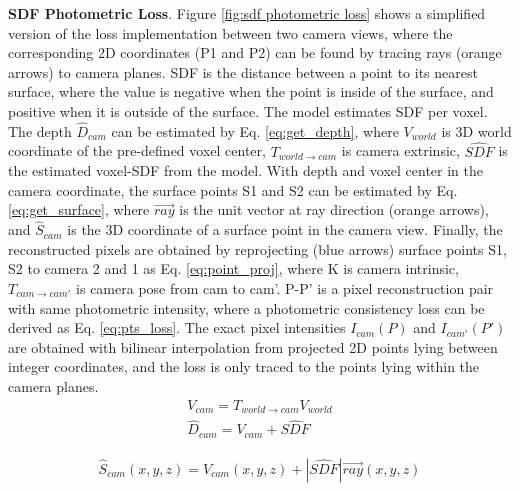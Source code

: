 \noindent
\textbf{SDF Photometric Loss}. Figure \ref{fig:sdf photometric loss} shows a simplified version of the loss implementation between two camera views, where the corresponding 2D coordinates (P1 and P2) can be found by tracing rays (orange arrows) to camera planes. SDF is the distance between a point to its nearest surface, where the value is negative when the point is inside of the surface, and positive when it is outside of the surface. The model estimates SDF per voxel. The depth $\hat{D}_{cam}$ can be estimated by Eq. \ref{eq:get_depth}, where $V_{world}$ is 3D world coordinate of the pre-defined voxel center, $T_{world\xrightarrow{}cam}$ is camera extrinsic, $\hat{SDF}$ is the estimated voxel-SDF from the model. With depth and voxel center in the camera coordinate, the surface points S1 and S2 can be estimated by Eq. \ref{eq:get_surface}, where $\vec{ray}$ is the unit vector at ray direction (orange arrows), and $\hat{S}_{cam}$ is the 3D coordinate of a surface point in the camera view. Finally, the reconstructed pixels are obtained by reprojecting (blue arrows) surface points S1, S2 to camera 2 and 1 as Eq. \ref{eq:point_proj}, where K is camera intrinsic, $T_{cam\xrightarrow{}cam'}$ is camera pose from cam to cam'. P-P' is a pixel reconstruction pair with same photometric intensity, where a photometric consistency loss can be derived as Eq. \ref{eq:pts_loss}. The exact pixel intensities $I_{cam}(P)$ and $I_{cam'}(P')$ are obtained with bilinear interpolation from projected 2D points lying between integer coordinates, and the loss is only traced to the points lying within the camera planes.
\vspace{-3mm}
\begin{equation}
\begin{split}
    V_{cam} = T_{world\xrightarrow{}cam}V_{world} \\
    \hat{D}_{cam} = V_{cam} + \hat{SDF}
    \label{eq:get_depth}
\end{split}
\end{equation}
\vspace{-6mm}

\vspace{-5mm}
\begin{equation}
\begin{split}
    \hat{S}_{cam}(x, y, z) = V_{cam}(x, y, z) + |\hat{SDF}| \Vec{ray}(x, y, z)
    \label{eq:get_surface}
\end{split}
\end{equation}
\vspace{-6mm}

